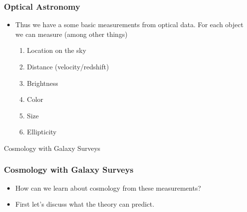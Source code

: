 \documentclass{beamer}
\begin{document}
\frame
{

    \frametitle{Optical Astronomy}


    \begin{itemize}

        \item Thus we have a some basic measurements from optical data.  For
            each object we can measure (among other things)

            \begin{enumerate}

                \item Location on the sky

                \item Distance (velocity/redshift)

                \item Brightness

                \item Color

                \item Size

                \item Ellipticity

            \end{enumerate}


    \end{itemize}

}

\frame
{

    {\huge Cosmology with Galaxy Surveys}

}


\frame
{

    \frametitle{Cosmology with Galaxy Surveys}


    \begin{itemize}

        \item How can we learn about cosmology from these measurements?

        \item First let's discuss what the theory can predict.

    \end{itemize}

}
\end{document}
